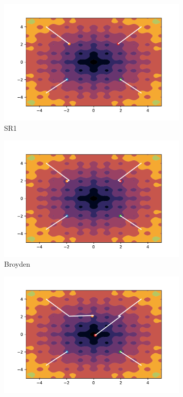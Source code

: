 \begin{figure}[h!]
    \begin{subfigure}{0.5\textwidth}
        \includegraphics[width=\textwidth, trim=1.4cm 0.5cm 1.3cm 1cm, clip]{assets/SR1/ackley.pdf}
        \caption{SR1}
    \end{subfigure}
    \begin{subfigure}{0.5\textwidth}
        \includegraphics[width=\textwidth, trim=1.4cm 0.5cm 1.3cm 1cm, clip]{assets/Broyden/ackley.pdf}
        \caption{Broyden}
    \end{subfigure}
    \begin{subfigure}{0.5\textwidth}
        \includegraphics[width=\textwidth, trim=1.4cm 0.5cm 1.3cm 1cm, clip]{assets/DFP/ackley.pdf}

\end{subfigure}
\end{figure}
